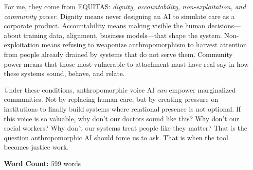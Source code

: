 \documentclass[12pt,twoside]{article}
\begin{document}
For me, they come from EQUITAS: \emph{dignity, accountability, non-exploitation, and community power}. Dignity means never designing an AI to simulate care as a corporate product. Accountability means making visible the human decisions—about training data, alignment, business models—that shape the system. Non-exploitation means refusing to weaponize anthropomorphism to harvest attention from people already drained by systems that do not serve them. Community power means that those most vulnerable to attachment must have real say in how these systems sound, behave, and relate.

Under these conditions, anthropomorphic voice AI \emph{can} empower marginalized communities. Not by replacing human care, but by creating pressure on institutions to finally build systems where relational presence is not optional. If this voice is so valuable, why don't our doctors sound like this? Why don't our social workers? Why don't our systems treat people like they matter? That is the question anthropomorphic AI should force us to ask. That is when the tool becomes justice work.

\vfill
\noindent\centering\footnotesize\textbf{Word Count:} 599 words
\end{document}
